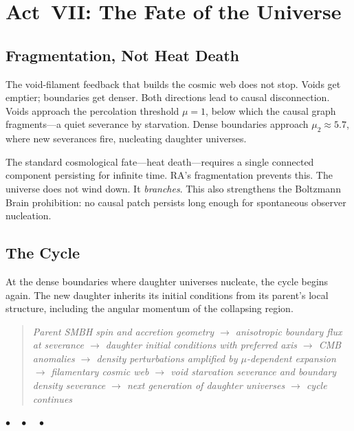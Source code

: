 \documentclass[12pt,a4paper]{article}
\begin{document}
\section{Act~VII: The Fate of the Universe}

\subsection{Fragmentation, Not Heat Death}

The void-filament feedback that builds the cosmic web does not stop. Voids get emptier; boundaries get denser. Both directions lead to causal disconnection. Voids approach the percolation threshold $\mu=1$, below which the causal graph fragments---a quiet severance by starvation. Dense boundaries approach $\mu_2 \approx 5.7$, where new severances fire, nucleating daughter universes.

The standard cosmological fate---heat death---requires a single connected component persisting for infinite time. RA's fragmentation prevents this. The universe does not wind down. It \emph{branches}. This also strengthens the Boltzmann Brain prohibition: no causal patch persists long enough for spontaneous observer nucleation.

\subsection{The Cycle}

At the dense boundaries where daughter universes nucleate, the cycle begins again. The new daughter inherits its initial conditions from its parent's local structure, including the angular momentum of the collapsing region.

\begin{quote}\itshape
Parent SMBH spin and accretion geometry $\to$ anisotropic boundary flux at severance $\to$ daughter initial conditions with preferred axis $\to$ CMB anomalies $\to$ density perturbations amplified by $\mu$-dependent expansion $\to$ filamentary cosmic web $\to$ void starvation severance and boundary density severance $\to$ next generation of daughter universes $\to$ cycle continues
\end{quote}

\bigskip\begin{center}$\bullet\quad\bullet\quad\bullet$\end{center}\bigskip

\end{document}
